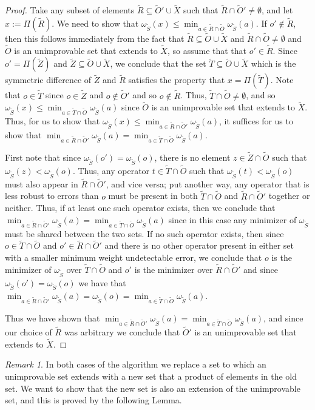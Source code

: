 \documentclass{amsbook}
\theoremstyle{plain}
\theoremstyle{definition}
\theoremstyle{remark}
\newtheorem{remark}{Remark}
\newcommand{\set}{\tilde}
\newcommand{\om}{\omega}
\begin{document}
\begin{proof}
Take any subset of elements $\set R\subseteq\set O'\cup\set X$ such that $\set R\cap\set O'\ne\emptyset$, and let $x := \Pi(\set R)$.  We need to show that $\om_{\set S}(x) \le \min_{a\in\set R\cap\set O}\om_{\set S}(a)$.  If $o'\notin\set R$, then this follows immediately from the fact that $\set R\subseteq\set O\cup \set X$ and $\set R\cap\set O\ne\emptyset$ and $\set O$ is an unimprovable set that extends to $\set X$, so assume that that $o'\in\set R$.  Since $o'=\Pi(\set Z)$ and $\set Z\subseteq\set O\cup\set X$, we conclude that the set $\set T\subseteq\set O\cup\set X$ which is the symmetric difference of $\set Z$ and $\set R$ satisfies the property that $x=\Pi(\set T)$.  Note that $o\in\set T$ since $o\in \set Z$ and $o\notin \set O'$ and so $o\notin \set R$.  Thus, $\set T \cap\set O\ne\emptyset$, and so $\om_{\set S}(x)\le \min_{a\in\set T\cap\set O}\om_{\set S}(a)$ since $\set O$ is an unimprovable set that extends to $\set X$.  Thus, for us to show that $\om_{\set S}(x) \le \min_{a\in\set R\cap\set O'}\om_{\set S}(a)$, it suffices for us to show that $\min_{a\in\set R\cap\set O'}\om_{\set S}(a)=\min_{a\in\set T\cap\set O}\om_{\set S}(a)$.

First note that since $\om_{\set S}(o')=\om_{\set S}(o)$, there is no element $z\in\set Z\cap\set O$ such that $\om_{\set S}(z)<\om_{\set S}(o)$.  Thus, any operator $t\in\set T\cap\set O$ such that $\om_{\set S}(t)<\om_{\set S}(o)$ must also appear in $\set R\cap\set O'$, and vice versa;  put another way, any operator that is less robust to errors than $o$ must be present in both $\set T\cap\set O$ and $\set R\cap\set O'$ together or neither.  Thus, if at least one such operator exists, then we conclude that $\min_{a\in\set R\cap\set O'}\om_{\set S}(a)=\min_{a\in\set T\cap\set O}\om_{\set S}(a)$ since in this case any minimizer of $\om_{\set S}$ must be shared between the two sets.  If no such operator exists, then since $o\in\set T\cap\set O$ and $o'\in\set R\cap\set O'$ and there is no other operator present in either set with a smaller minimum weight undetectable error, we conclude that $o$ is the minimizer of $\om_{\set S}$ over $\set T\cap\set O$ and $o'$ is the minimizer over $\set R\cap\set O'$ and since $\om_{\set S}(o')=\om_{\set S}(o)$ we have that $\min_{a\in\set R\cap\set O'}\om_{\set S}(a)=\om_{\set S}(o)=\min_{a\in\set T\cap\set O}\om_{\set S}(a)$.

Thus we have shown that $\min_{a\in\set R\cap\set O'}\om_{\set S}(a)=\min_{a\in\set T\cap\set O}\om_{\set S}(a)$, and since our choice of $\set R$ was arbitrary we conclude that $\set O'$ is an unimprovable set that extends to $\set X$.
\end{proof}
\begin{remark}
In both cases of the algorithm we replace a set to which an unimprovable set extends with a new set that a product of elements in the old set.  We want to show that the new set is also an extension of the unimprovable set, and this is proved by the following Lemma.
\end{remark}
\end{document}
